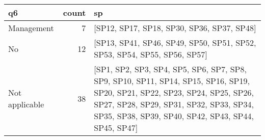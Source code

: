 \begin{tabular}{lrl}
\toprule
             q6 &  count &                                                                                                                                                                                                                           sp \\
\midrule
     Management &      7 &                                                                                                                                                                                   [SP12, SP17, SP18, SP30, SP36, SP37, SP48] \\
             No &     12 &                                                                                                                                                     [SP13, SP41, SP46, SP49, SP50, SP51, SP52, SP53, SP54, SP55, SP56, SP57] \\
 Not applicable &     38 &  [SP1, SP2, SP3, SP4, SP5, SP6, SP7, SP8, SP9, SP10, SP11, SP14, SP15, SP16, SP19, SP20, SP21, SP22, SP23, SP24, SP25, SP26, SP27, SP28, SP29, SP31, SP32, SP33, SP34, SP35, SP38, SP39, SP40, SP42, SP43, SP44, SP45, SP47] \\
\bottomrule
\end{tabular}
